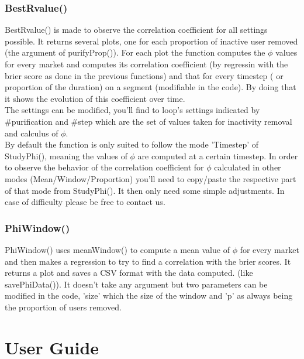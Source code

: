\documentclass{report}
\begin{document}
\subsection{BestRvalue()}

BestRvalue() is made to observe the correlation coefficient for all settings possible. It returns several plots, one for each proportion of inactive user removed (the argument of purifyProp()). For each plot the function computes the $\phi $ values for every market and computes its correlation coefficient (by regressin with the brier score as done in the previous functions) and that for every timestep ( or proportion of the duration) on a segment (modifiable in the code). By doing that it shows the evolution of this coefficient over time.\\

The settings can be modified, you'll find to loop's settings indicated by \#purification and \#step which are the set of values taken for inactivity removal and calculus of  $\phi $.\\

By default the function is only suited to follow the mode 'Timestep' of StudyPhi(), meaning the values of  $\phi $ are computed at a certain timestep. In order to observe the behavior of the correlation coefficient for  $\phi $ calculated in other modes (Mean/Window/Proportion) you'll need to copy/paste the respective part of that mode from StudyPhi(). It then only need some simple adjustments. In case of difficulty please be free to contact us.

\subsection{PhiWindow()}

PhiWindow() uses meanWindow() to compute a mean value of $\phi $ for every market and then makes a regression to try to find a correlation with the brier scores. It returns a plot and saves a CSV format with the data computed. (like savePhiData()). It doesn't take any argument but two parameters can be modified in the code, 'size' which the size of the window and 'p' as always being the proportion of users removed.

\chapter{User Guide}
\end{document}
